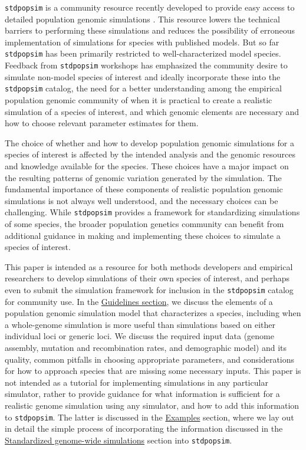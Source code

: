 \documentclass[hidelinks]{article}
\newcommand{\stdpopsim}{\texttt{stdpopsim}\xspace}
\begin{document}
\stdpopsim is a community resource recently developed to provide easy
access to detailed population genomic simulations \citep{Adrion2020}. This
resource lowers the technical barriers to performing these simulations
and reduces the possibility of erroneous implementation of simulations
for species with published models. But so far \stdpopsim has been
primarily restricted to well-characterized model species. Feedback from
\stdpopsim workshops has emphasized the community desire to simulate
non-model species of interest and ideally incorporate these into the \stdpopsim catalog,
the need for a better understanding among the empirical population
genomic community of when it is practical to create a realistic
simulation of a species of interest, and which genomic elements are
necessary and how to choose relevant parameter estimates for them.

The choice of whether and how to develop population genomic
simulations for a species of interest is affected by the intended
analysis and the genomic resources and knowledge available for the
species. These choices have a major impact on the resulting patterns of
genomic variation generated by the simulation. The fundamental
importance of these components of realistic population genomic
simulations is not always well understood, and the necessary choices can
be challenging. While \stdpopsim provides a framework for standardizing
simulations of some species, the broader population genetics community
can benefit from additional guidance in making and implementing these
choices to simulate a species of interest.

This paper is intended as a resource for both methods
developers and empirical researchers to develop simulations of their own
species of interest, and perhaps even to submit the simulation
framework for inclusion in the \stdpopsim catalog for community use.
In the \hyperref[sec:sim-guidelines]{Guidelines section}, 
we discuss the elements of a
population genomic simulation model that characterizes a
species, including when a whole-genome simulation is more useful than
simulations based on either individual loci or generic loci.
We discuss the required input data (genome assembly, 
mutation and recombination rates, and demographic model) and
its quality, common pitfalls in choosing appropriate parameters, and
considerations for how to approach species that are missing some
necessary inputs. This paper is not intended as a tutorial for
implementing simulations in any particular simulator, rather to provide
guidance for what information is sufficient for a realistic genome simulation
using any simulator, and how to add this information to \stdpopsim. The latter 
is discussed in the \hyperref[sec:examples]{Examples} section, where we lay out in
detail the simple process of incorporating the information discussed 
in the \hyperref[sec:sim-guidelines]{Standardized genome-wide simulations} section into \stdpopsim. 
\end{document}
